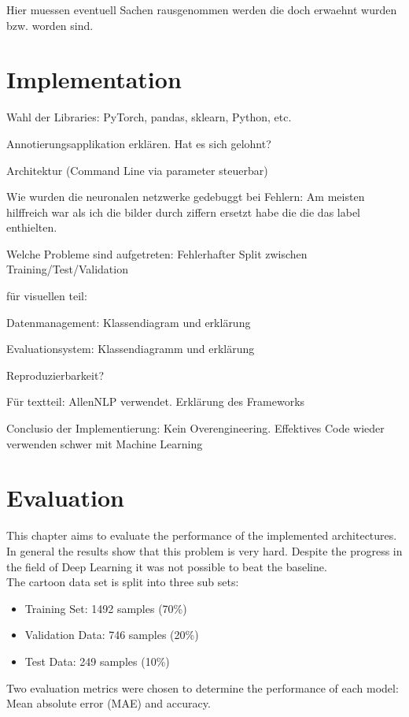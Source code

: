 \documentclass[draft,final,oneside]{vutinfth} %
\begin{document}
Hier muessen eventuell Sachen rausgenommen werden die doch erwaehnt wurden bzw. worden sind.

\chapter{Implementation}

Wahl der Libraries: PyTorch, pandas, sklearn, Python, etc.

Annotierungsapplikation erklären. Hat es sich gelohnt?

Architektur (Command Line via parameter steuerbar)

Wie wurden die neuronalen netzwerke gedebuggt bei Fehlern: Am meisten hilffreich war als ich die bilder durch ziffern ersetzt habe die die das label enthielten.

Welche Probleme sind aufgetreten: Fehlerhafter Split zwischen Training/Test/Validation

für visuellen teil:

Datenmanagement: Klassendiagram und erklärung

Evaluationsystem: Klassendiagramm und erklärung

Reproduzierbarkeit?

Für textteil: AllenNLP verwendet. Erklärung des Frameworks 

Conclusio der Implementierung: Kein Overengineering. Effektives Code wieder verwenden schwer mit Machine Learning

\chapter{Evaluation}

This chapter aims to evaluate the performance of the implemented architectures. In
general the results show that this problem is very hard. Despite the progress in the field of Deep Learning it was not possible to beat the baseline. \\

The cartoon data set is split into three sub sets:

\begin{itemize}
\item Training Set: 1492 samples (70\%)
\item Validation Data: 746 samples (20\%)
\item Test Data: 249 samples (10\%)
\end{itemize}

Two evaluation metrics were chosen to determine the performance of each model: Mean absolute error (MAE) and accuracy.
\end{document}
